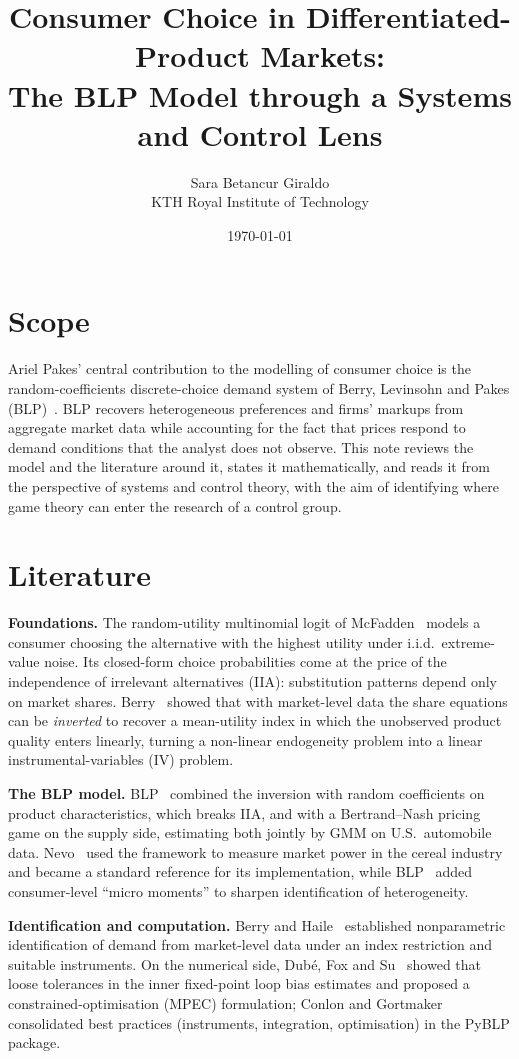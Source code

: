 \documentclass[10pt,a4paper]{article}
\title{\vspace{-1.5cm}Consumer Choice in Differentiated-Product Markets:\\
The BLP Model through a Systems and Control Lens}
\author{Sara Betancur Giraldo\\\small KTH Royal Institute of Technology}
\date{\vspace{-0.6em}\today}
\begin{document}
\maketitle
\vspace{-1.2em}

\section{Scope}
Ariel Pakes' central contribution to the modelling of consumer choice is the
random-coefficients discrete-choice demand system of Berry, Levinsohn and
Pakes (BLP)~\cite{BLP1995}. BLP recovers heterogeneous preferences and firms'
markups from aggregate market data while accounting for the fact that prices
respond to demand conditions that the analyst does not observe. This note
reviews the model and the literature around it, states it mathematically, and
reads it from the perspective of systems and control theory, with the aim of
identifying where game theory can enter the research of a control group.

\section{Literature}
\textbf{Foundations.} The random-utility multinomial logit of
McFadden~\cite{McFadden1974} models a consumer choosing the alternative with the
highest utility under i.i.d.\ extreme-value noise. Its closed-form choice
probabilities come at the price of the independence of irrelevant alternatives
(IIA): substitution patterns depend only on market shares.
Berry~\cite{Berry1994} showed that with market-level data the share equations
can be \emph{inverted} to recover a mean-utility index in which the unobserved
product quality enters linearly, turning a non-linear endogeneity problem into
a linear instrumental-variables (IV) problem.

\textbf{The BLP model.} BLP~\cite{BLP1995} combined the inversion with random
coefficients on product characteristics, which breaks IIA, and with a
Bertrand--Nash pricing game on the supply side, estimating both jointly by GMM
on U.S.\ automobile data. Nevo~\cite{Nevo2001} used the framework to measure
market power in the cereal industry and became a standard reference for its
implementation, while BLP~\cite{BLP2004} added consumer-level ``micro moments''
to sharpen identification of heterogeneity.

\textbf{Identification and computation.} Berry and Haile~\cite{BerryHaile2014}
established nonparametric identification of demand from market-level data under
an index restriction and suitable instruments. On the numerical side, Dub\'e,
Fox and Su~\cite{DubeFoxSu2012} showed that loose tolerances in the inner
fixed-point loop bias estimates and proposed a constrained-optimisation (MPEC)
formulation; Conlon and Gortmaker~\cite{ConlonGortmaker2020} consolidated best
practices (instruments, integration, optimisation) in the PyBLP package.
\end{document}
